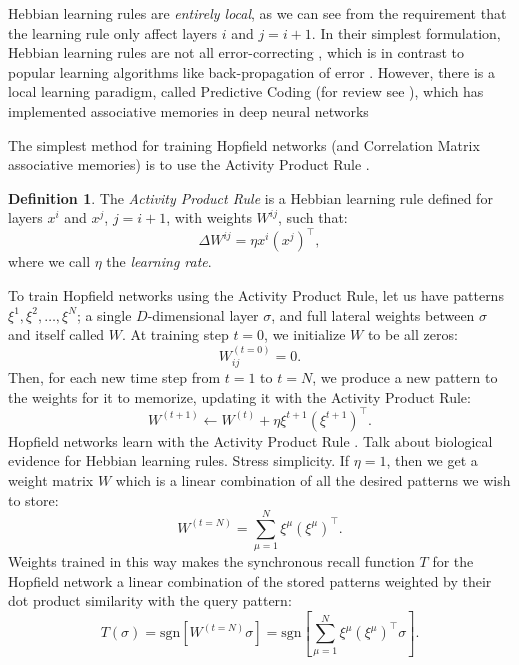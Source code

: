 \documentclass{article}
\theoremstyle{definition}
\newtheorem{definition}{Definition}[subsection]
\begin{document}
Hebbian learning rules are \textit{entirely local}, as we can see from
the requirement that the learning rule only affect layers $i$ and $j = i + 1$.
In their simplest formulation, Hebbian learning rules are not
all error-correcting \parencite{munakata_how_2006},
which is in contrast to popular learning algorithms
like back-propagation of error \parencite{rumelhart_learning_1986}. However,
there is a local learning paradigm, called Predictive Coding (for review see
\textcite{spratling_review_2017}), which
has implemented associative memories in deep neural networks
\parencite{salvatori_associative_2021}

The simplest method for training Hopfield networks (and Correlation
  Matrix associative
memories) is to use the Activity Product Rule \parencite{haykin_neural_2009}.

\begin{definition}\label{def:activity-product}
  The \textit{Activity Product Rule} is a Hebbian learning rule defined
  for layers $x^i$ and $x^j$, $j = i+1$, with weights $W^{ij}$, such that:
  \begin{equation}
    \Delta W^{ij} = \eta x^i (x^j)^\top,
  \end{equation}
  where we call $\eta$ the \textit{learning rate}.
\end{definition}
\noindent
To train Hopfield networks using the Activity Product Rule,
let us have patterns $\xi^1, \xi^2, \dots, \xi^N$; a single
$D$-dimensional layer $\sigma$, and full lateral weights between $\sigma$
and itself called $W$. At training step $t=0$, we initialize $W$
to be all zeros:
\begin{equation}
  W^{(t=0)}_{ij} = 0.
\end{equation}
Then, for each new time step from $t=1$ to $t = N$, we produce a new
pattern to the weights for it to memorize, updating it with
the Activity Product Rule:
\begin{equation}
  W^{(t+1)} \gets W^{(t)} + \eta \xi^{t+1} (\xi^{t+1})^\top.
\end{equation}Hopfield networks learn with the Activity Product Rule
\parencite{haykin_neural_2009}.
Talk about biological evidence for Hebbian learning rules. Stress simplicity.
If $\eta = 1$, then we get a weight matrix $W$ which is a
linear combination of all the desired patterns we wish to store:
\begin{equation}
  W^{(t=N)} = \sum^N_{\mu=1} \xi^\mu (\xi^\mu)^\top.
\end{equation}
Weights trained in this way makes the synchronous recall function $T$
for the Hopfield network a linear combination of the stored patterns
weighted by their dot product similarity with the query pattern:
\begin{equation}
  T(\sigma) = \text{sgn}\left[W^{(t=N)} \sigma \right] =
  \text{sgn}\left[ \sum^N_{\mu=1} \xi^\mu (\xi^\mu)^\top \sigma\right].
\end{equation}
\end{document}
